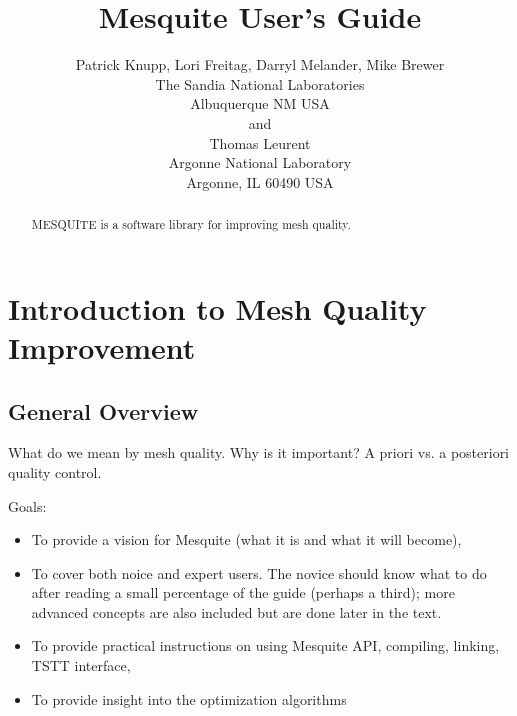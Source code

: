 
\pagestyle{empty}

\title{ {\LARGE\bf Mesquite User's Guide}}

\author{Patrick Knupp, Lori Freitag, Darryl Melander, Mike Brewer \\
The Sandia National Laboratories \\
Albuquerque NM USA \\
and \\
Thomas Leurent \\
Argonne National Laboratory \\
Argonne, IL 60490 USA}

\date{}




\maketitle
\begin{abstract} 
MESQUITE is a software library for improving mesh quality. 
\end{abstract}

\tableofcontents

\listoffigures

\listoftables

\section{Introduction to Mesh Quality Improvement} 

\subsection{General Overview}
What do we mean by mesh quality. Why is it important? A priori vs. a posteriori
quality control.

Goals:
\begin{itemize}
\item To provide a vision for Mesquite (what it is and what it will become),
\item To cover both noice and expert users. The novice should know what to
do after reading a small percentage of the guide (perhaps a third); more 
advanced concepts are also included but are done later in the text.
\item To provide practical instructions on using Mesquite API, compiling,
linking, TSTT interface,
\item To provide insight into the optimization algorithms
\end{itemize}


